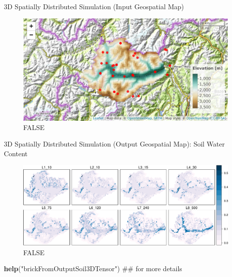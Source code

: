 \documentclass[ignorenonframetext,]{beamer}
\newenvironment{Shaded}{\begin{snugshade}}{\end{snugshade}}
\newcommand{\KeywordTok}[1]{\textcolor[rgb]{0.13,0.29,0.53}{\textbf{#1}}}
\newcommand{\StringTok}[1]{\textcolor[rgb]{0.31,0.60,0.02}{#1}}
\newcommand{\NormalTok}[1]{#1}
\begin{document}
\begin{frame}{3D Spatially Distributed Simulation (Input Geospatial
Map)}

\begin{figure}
\centering
\includegraphics{presentation_files/figure-beamer/unnamed-chunk-14-1.pdf}
\caption{FALSE}
\end{figure}

\end{frame}

\begin{frame}[fragile]{3D Spatially Distributed Simulation (Output
Geospatial Map): Soil Water Content}

\begin{figure}
\centering
\includegraphics{presentation_files/figure-beamer/unnamed-chunk-15-1.pdf}
\caption{FALSE}
\end{figure}

\begin{Shaded}
\begin{Highlighting}[]
\KeywordTok{help}\NormalTok{(}\StringTok{"brickFromOutputSoil3DTensor"}\NormalTok{) ## for more details}
\end{Highlighting}
\end{Shaded}

\end{frame}
\end{document}
